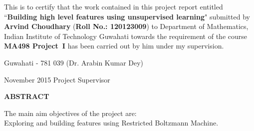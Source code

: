 \documentclass[12pt,a4paper]{report}
\theoremstyle{plain}
\theoremstyle{definition}
\theoremstyle{remark}
\begin{document}
\noindent
This is to certify that the work contained in this project report
entitled ``{\bf Building high level features using unsupervised learning}" submitted
by {\bf Arvind Choudhary} ({\bf Roll No.: 120123009}) to Department of Mathematics, Indian Institute of Technology Guwahati
towards the requirement of the course \textbf{MA498 Project~I}
has been carried out by him under my
supervision.

\vspace{4cm}

\noindent Guwahati - 781 039 \hfill (Dr. Arabin Kumar Dey)

\noindent November 2015 \hfill Project Supervisor

\clearpage

\begin{center}
{\Large{\bf{ABSTRACT}}}
\end{center}


The main aim objectives of the project are:\\
Exploring and building features using Restricted Boltzmann Machine.

\clearpage



\tableofcontents
\clearpage


\newpage

\setcounter{page}{1}










\nocite{gm} \nocite{DBLP:journals/corr/abs-1305-0445} \nocite{Bengio:2009:LDA:1658423.1658424}



\end{document}
